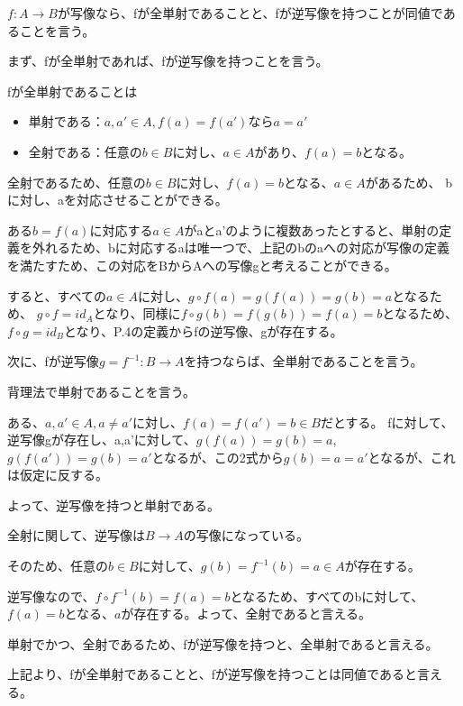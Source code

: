 \documentclass{jsarticle}
\begin{document}
$f:A \rightarrow B$が写像なら、fが全単射であることと、fが逆写像を持つことが同値であることを言う。

まず、fが全単射であれば、fが逆写像を持つことを言う。

fが全単射であることは

\begin{itemize}
\item 単射である：$a, a' \in A, f(a) = f(a')$なら$a=a'$
\item 全射である：任意の$b \in B$に対し、$a \in A$があり、$f(a) = b$となる。
\end{itemize}

全射であるため、任意の$b \in B$に対し、$f(a) = b$となる、$a \in A$があるため、
bに対し、aを対応させることができる。

ある$b = f(a)$に対応する$a \in A$がaとa'のように複数あったとすると、単射の定義を外れるため、bに対応するaは唯一つで、上記のbのaへの対応が写像の定義を満たすため、この対応をBからAへの写像gと考えることができる。

すると、すべての$a \in A$に対し、$g \circ f(a) = g(f(a)) = g(b) = a$となるため、
$g \circ f = id_A$となり、同様に$f \circ g(b) = f(g(b)) = f(a) = b$となるため、
$f \circ g = id_B$となり、P.4の定義からfの逆写像、gが存在する。

次に、fが逆写像$g = f^{-1} : B \rightarrow A$を持つならば、全単射であることを言う。

背理法で単射であることを言う。

ある、$a, a' \in A, a \neq a'$に対し、$f(a) = f(a') = b \in B$だとする。
fに対して、逆写像gが存在し、a,a'に対して、$g(f(a)) = g(b) = a$, $g(f(a')) = g(b) = a'$となるが、この2式から$g(b) = a = a'$となるが、これは仮定に反する。

よって、逆写像を持つと単射である。

全射に関して、逆写像は$B \rightarrow A$の写像になっている。

そのため、任意の$b \in B$に対して、$g(b) = f^{-1}(b) = a \in A$が存在する。

逆写像なので、$f \circ f^{-1}(b) = f(a) = b$となるため、すべてのbに対して、$f(a) = b$となる、$a$が存在する。よって、全射であると言える。

単射でかつ、全射であるため、fが逆写像を持つと、全単射であると言える。

上記より、fが全単射であることと、fが逆写像を持つことは同値であると言える。
\end{document}
